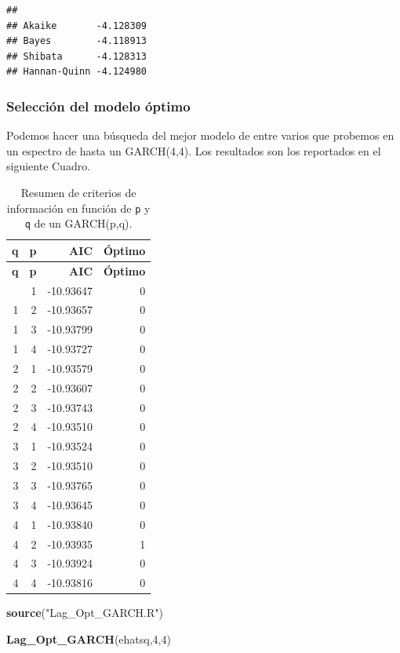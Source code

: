 \documentclass[
]{book}
\newenvironment{Shaded}{\begin{snugshade}}{\end{snugshade}}
\newcommand{\DecValTok}[1]{\textcolor[rgb]{0.00,0.00,0.81}{#1}}
\newcommand{\FunctionTok}[1]{\textcolor[rgb]{0.13,0.29,0.53}{\textbf{#1}}}
\newcommand{\NormalTok}[1]{#1}
\newcommand{\StringTok}[1]{\textcolor[rgb]{0.31,0.60,0.02}{#1}}
\begin{document}
\begin{verbatim}
##                       
## Akaike       -4.128309
## Bayes        -4.118913
## Shibata      -4.128313
## Hannan-Quinn -4.124980
\end{verbatim}

\hypertarget{selecciuxf3n-del-modelo-uxf3ptimo}{%
\subsubsection{Selección del modelo óptimo}\label{selecciuxf3n-del-modelo-uxf3ptimo}}

Podemos hacer una búsqueda del mejor modelo de entre varios que probemos en un espectro de hasta un GARCH(4,4). Los resultados son los reportados en el siguiente Cuadro.

\begin{longtable}[]{@{}rrrr@{}}
\caption{\label{tab:criterios} Resumen de criterios de información en función de \texttt{p} y \texttt{q} de un GARCH(p,q).}\tabularnewline
\toprule\noalign{}
\textbf{q} & \textbf{p} & \textbf{AIC} & \textbf{Óptimo} \\
\midrule\noalign{}
\endfirsthead
\toprule\noalign{}
\textbf{q} & \textbf{p} & \textbf{AIC} & \textbf{Óptimo} \\
\midrule\noalign{}
\endhead
\bottomrule\noalign{}
\endlastfoot
1 & 1 & -10.93647 & 0 \\
1 & 2 & -10.93657 & 0 \\
1 & 3 & -10.93799 & 0 \\
1 & 4 & -10.93727 & 0 \\
2 & 1 & -10.93579 & 0 \\
2 & 2 & -10.93607 & 0 \\
2 & 3 & -10.93743 & 0 \\
2 & 4 & -10.93510 & 0 \\
3 & 1 & -10.93524 & 0 \\
3 & 2 & -10.93510 & 0 \\
3 & 3 & -10.93765 & 0 \\
3 & 4 & -10.93645 & 0 \\
4 & 1 & -10.93840 & 0 \\
4 & 2 & -10.93935 & 1 \\
4 & 3 & -10.93924 & 0 \\
4 & 4 & -10.93816 & 0 \\
\end{longtable}

\begin{Shaded}
\begin{Highlighting}[]
\FunctionTok{source}\NormalTok{(}\StringTok{"Lag\_Opt\_GARCH.R"}\NormalTok{)}

\FunctionTok{Lag\_Opt\_GARCH}\NormalTok{(ehatsq,}\DecValTok{4}\NormalTok{,}\DecValTok{4}\NormalTok{)}
\end{Highlighting}
\end{Shaded}
\end{document}
